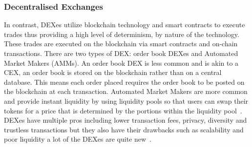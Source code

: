 \subsubsection{Decentralised Exchanges}
In contrast, DEXes utilize blockchain technology and smart contracts to execute trades thus providing a high level of determinism, by nature of the technology. These trades are executed on the blockchain via smart contracts and on-chain transactions. There are two types of DEX: order book DEXes and Automated Market Makers (AMMs). An order book DEX is less common and is akin to a CEX, an order book is stored on the blockchain rather than on a central database. This means each order placed requires the order book to be posted on the blockchain at each transaction. Automated Market Makers are more common and provide instant liquidity by using liquidity pools so that users can swap their tokens for a price that is determined by the portions within the liquidity pool~\cite{DEXes}. DEXes have multiple pros including lower transaction fees, privacy, diversity and trustless transactions but they also have their drawbacks such as scalability and poor liquidity a lot of the DEXes are quite new~\cite{DEXvsCEX}.

